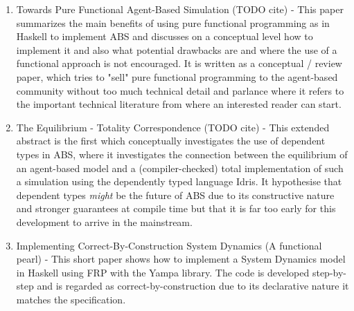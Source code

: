 \begin{enumerate}
	\item Towards Pure Functional Agent-Based Simulation (TODO cite) - This paper summarizes the main benefits of using pure functional programming as in Haskell to implement ABS and discusses on a conceptual level how to implement it and also what potential drawbacks are and where the use of a functional approach is not encouraged. It is written as a conceptual / review paper, which tries to "sell" pure functional programming to the agent-based community without too much technical detail and parlance where it refers to the important technical literature from where an interested reader can start.

	\item The Equilibrium - Totality Correspondence (TODO cite) - This extended abstract is the first which conceptually investigates the use of dependent types in ABS, where it investigates the connection between the equilibrium of an agent-based model and a (compiler-checked) total implementation of such a simulation using the dependently typed language Idris. It hypothesise that dependent types \textit{might} be the future of ABS due to its constructive nature and stronger guarantees at compile time but that it is far too early for this development to arrive in the mainstream.

	\item Implementing Correct-By-Construction System Dynamics (A functional pearl) - This short paper shows how to implement a System Dynamics model in Haskell using FRP with the Yampa library. The code is developed step-by-step and is regarded as correct-by-construction due to its declarative nature it matches the specification. 
\end{enumerate}

